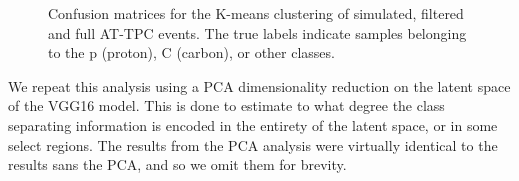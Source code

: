\begin{figure}
\centering
	\hspace{-1cm}
	\hspace{-1cm}
\caption[Pre-trained network - confusion matrices]{Confusion matrices for the K-means clustering of simulated, filtered and full AT-TPC events. The true labels indicate samples belonging to the p (proton), C (carbon), or other classes. }\label{fig:clster_confmat}
\end{figure}

We repeat this analysis using a PCA dimensionality reduction on the latent space of the VGG16 model. This is done to estimate to what degree the class separating information is encoded in the entirety of the latent space, or in some select regions. The results from the PCA analysis were virtually identical to the results sans the PCA, and so we omit them for brevity. 
